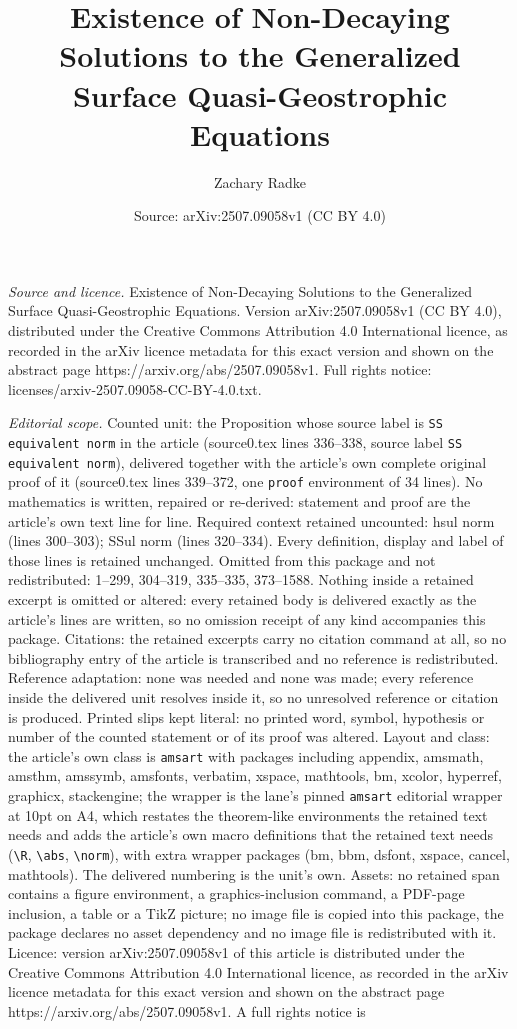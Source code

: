 \documentclass[10pt,a4paper]{amsart}
\title[Existence of Non-Decaying Solutions to the Generalized Surfa]{Existence of Non-Decaying Solutions to the Generalized Surface Quasi-Geostrophic Equations}
\author{Zachary Radke}
\date{Source: arXiv:2507.09058v1 (CC BY 4.0)}
\begin{document}
\maketitle

\noindent\emph{Source and licence.} Existence of Non-Decaying Solutions to the Generalized Surface Quasi-Geostrophic Equations. Version arXiv:2507.09058v1 (CC BY 4.0), distributed under the Creative Commons Attribution 4.0 International licence, as recorded in the arXiv licence metadata for this exact version and shown on the abstract page https://arxiv.org/abs/2507.09058v1. Full rights notice: licenses/arxiv-2507.09058-CC-BY-4.0.txt.\par\smallskip

\noindent\textit{Editorial scope.} Counted unit: the Proposition whose source label is \texttt{SS equivalent norm} in the article (source0.tex lines 336--338, source label \texttt{SS equivalent norm}), delivered together with the article's own complete original proof of it (source0.tex lines 339--372, one \texttt{proof} environment of 34 lines). No mathematics is written, repaired or re-derived: statement and proof are the article's own text line for line. Required context retained uncounted: hsul norm (lines 300--303); SSul norm (lines 320--334). Every definition, display and label of those lines is retained unchanged. Omitted from this package and not redistributed: 1--299, 304--319, 335--335, 373--1588. Nothing inside a retained excerpt is omitted or altered: every retained body is delivered exactly as the article's lines are written, so no omission receipt of any kind accompanies this package. Citations: the retained excerpts carry no citation command at all, so no bibliography entry of the article is transcribed and no reference is redistributed. Reference adaptation: none was needed and none was made; every reference inside the delivered unit resolves inside it, so no unresolved reference or citation is produced. Printed slips kept literal: no printed word, symbol, hypothesis or number of the counted statement or of its proof was altered. Layout and class: the article's own class is \texttt{amsart} with packages including appendix, amsmath, amsthm, amssymb, amsfonts, verbatim, xspace, mathtools, bm, xcolor, hyperref, graphicx, stackengine; the wrapper is the lane's pinned \texttt{amsart} editorial wrapper at 10pt on A4, which restates the theorem-like environments the retained text needs and adds the article's own macro definitions that the retained text needs (\texttt{\textbackslash R}, \texttt{\textbackslash abs}, \texttt{\textbackslash norm}), with extra wrapper packages (bm, bbm, dsfont, xspace, cancel, mathtools). The delivered numbering is the unit's own. Assets: no retained span contains a figure environment, a graphics-inclusion command, a PDF-page inclusion, a table or a TikZ picture; no image file is copied into this package, the package declares no asset dependency and no image file is redistributed with it. Licence: version arXiv:2507.09058v1 of this article is distributed under the Creative Commons Attribution 4.0 International licence, as recorded in the arXiv licence metadata for this exact version and shown on the abstract page https://arxiv.org/abs/2507.09058v1. A full rights notice is 
\end{document}
